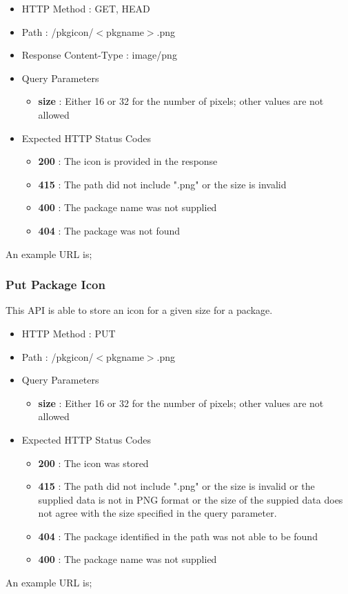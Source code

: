 \begin{itemize}
\item HTTP Method : GET, HEAD
\item Path : /pkgicon/$<$pkgname$>$.png
\item Response Content-Type : image/png
\item Query Parameters
  \begin{itemize}
  \item {\bf size} : Either 16 or 32 for the number of pixels; other values are not allowed
  \end{itemize}
\item Expected HTTP Status Codes
  \begin{itemize}
  \item {\bf 200} : The icon is provided in the response
  \item {\bf 415} : The path did not include ".png" or the size is invalid
  \item {\bf 400} : The package name was not supplied
  \item {\bf 404} : The package was not found
  \end{itemize}
\end{itemize}

An example URL is;


\subsubsection{Put Package Icon}

This API is able to store an icon for a given size for a package.

\begin{itemize}
\item HTTP Method : PUT
\item Path : /pkgicon/$<$pkgname$>$.png
\item Query Parameters
  \begin{itemize}
  \item {\bf size} : Either 16 or 32 for the number of pixels; other values are not allowed
  \end{itemize}
\item Expected HTTP Status Codes
  \begin{itemize}
  \item {\bf 200} : The icon was stored
  \item {\bf 415} : The path did not include ".png" or the size is invalid or the supplied data is not in PNG format or the size of the suppied data does not agree with the size specified in the query parameter.
  \item {\bf 404} : The package identified in the path was not able to be found
  \item {\bf 400} : The package name was not supplied
  \end{itemize}
\end{itemize}

An example URL is;





